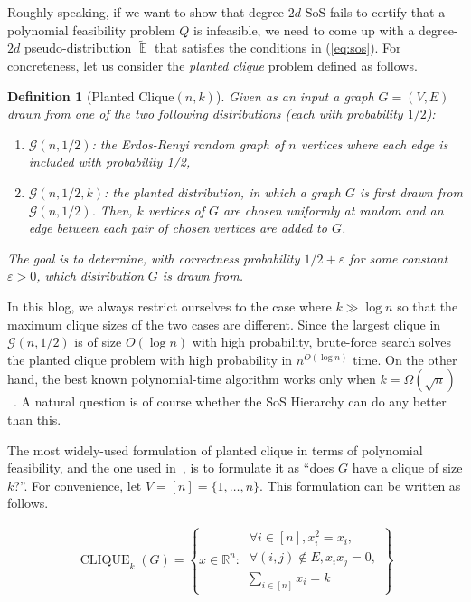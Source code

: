 \documentclass{article}[11pt]
\DeclareMathOperator{\cli}{CLIQUE}
\newcommand{\cG}{\mathcal{G}}
\newcommand{\E}{\mathop{\mathbb{E}}}
\newcommand{\tE}{\tilde{\E}}
\newtheorem{definition}{Definition}
\let\Oldforall\forall
\renewcommand{\forall}{~\Oldforall} %
\newcounter{theorem-preserve}
\begin{document}
Roughly speaking, if we want to show that degree-$2d$ SoS fails to certify that a polynomial feasibility problem $Q$ is infeasible, we need to come up with a degree-$2d$ pseudo-distribution $\tE$ that satisfies the conditions in (\ref{eq:sos}). For concreteness, let us consider the \emph{planted clique} problem defined as follows.

\begin{definition}[Planted Clique$(n, k)$]
Given as an input a graph $G = (V, E)$ drawn from one of the two following distributions (each with probability $1/2$):
\begin{enumerate}[(1)]
\item $\cG(n, 1/2)$: the Erdos-Renyi random graph of $n$ vertices where each edge is included with probability 1/2,
\item $\cG(n, 1/2, k)$: the planted distribution, in which a graph $G$ is first drawn from $\cG(n, 1/2)$. Then, $k$ vertices of $G$ are chosen uniformly at random and an edge between each pair of chosen vertices are added to $G$.
\end{enumerate}
The goal is to determine, with correctness probability $1/2 + \varepsilon$ for some constant $\varepsilon > 0$, which distribution $G$ is drawn from.
\end{definition}

In this blog, we always restrict ourselves to the case where $k \gg \log n$ so that the maximum clique sizes of the two cases are different. Since the largest clique in $\cG(n, 1/2)$ is of size $O(\log n)$ with high probability, brute-force search solves the planted clique problem with high probability in $n^{O(\log n)}$ time. On the other hand, the best known polynomial-time algorithm works only when $k = \Omega(\sqrt{n})$~\cite{AKS98}. A natural question is of course whether the SoS Hierarchy can do any better than this.

The most widely-used formulation of planted clique in terms of polynomial feasibility, and the one used in~\cite{BHKKMP16}, is to formulate it as ``does $G$ have a clique of size $k$?''. For convenience, let $V = [n] = \{1, \dots, n\}$. This formulation can be written as follows.

\begin{align*}
\cli_k(G) =
\left\{x \in \mathbb{R}^n  :
\begin{array}{lr}
    \forall i \in [n], x_i^2 = x_i, \\
    \forall (i, j) \notin E, x_ix_j = 0, \\
    \sum_{i \in [n]} x_i = k
  \end{array}
\right\}
\end{align*}
\end{document}

